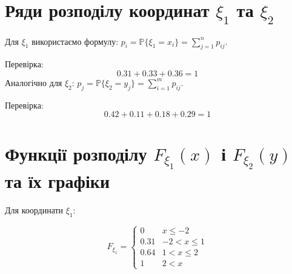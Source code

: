 \documentclass[14pt, a4paper, ukrainian]{extreport}
\begin{document}
	\section{Ряди розподілу координат $\xi_1$ та $\xi_2$}
	
	Для $\xi_1$ використаємо формулу: $ p_i = \mathbb{P} \{\xi_1 = x_i\} = \sum_{j = 1}^{n} p_{ij}$.
	
	\begin{table}[H]
		\caption{\label{tab:xi1} Ряд розподілу $\xi_1$}
		\begin{center}
		\end{center}
	\end{table}
	
	Перевірка: 	$$ 0.31 + 0.33 + 0.36 = 1$$	
	Аналогічно для $\xi_2$: $ p_j = \mathbb{P} \{\xi_2 = y_j\} = \sum_{i = 1}^{m} p_{ij} $.
	
	\begin{table}[H]
		\caption{\label{tab:xi2} Ряд розподілу $\xi_2$}
		\begin{center}
		\end{center}
	\end{table}

	Перевірка:  $$ 0.42 + 0.11 + 0.18 + 0.29 = 1 $$

	\section{Функції розподілу $F_{\xi_1}(x)$ і $F_{\xi_2}(y)$ та їх графіки}
	
	Для координати $\xi_1$:
	
	$$ F_{\xi_1} =  \begin{cases}
		0  & x \le -2\\
		0.31 & -2 < x \le 1\\
		0.64 & 1 < x \le 2\\
		1 & 2 < x
	\end{cases}
	$$
	
\end{document}
